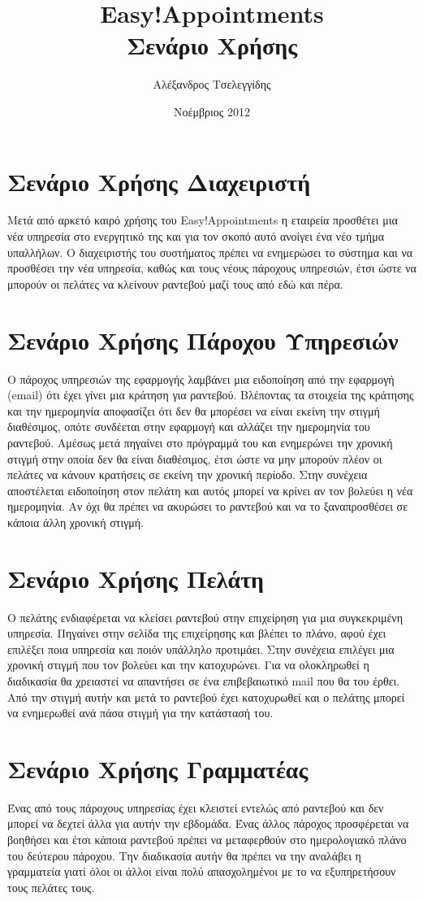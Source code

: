 \documentclass[12pt]{article}
\title{{\Huge {\bf Easy!Appointments}} \\[0.3cm] Σενάριο Χρήσης}
\author{Αλέξανδρος Τσελεγγίδης}
\date{Νοέμβριος 2012}
\begin{document}
\maketitle 
\thispagestyle{empty} %
\pagebreak

\section{Σενάριο Χρήσης Διαχειριστή}
Μετά από αρκετό καιρό χρήσης του Easy!Appointments η εταιρεία προσθέτει μια νέα υπηρεσία στο ενεργητικό της και για τον σκοπό αυτό ανοίγει ένα νέο τμήμα υπαλλήλων. Ο διαχειριστής του συστήματος πρέπει να ενημερώσει το σύστημα και να προσθέσει την νέα υπηρεσία, καθώς και τους νέους πάροχους υπηρεσιών, έτσι ώστε να μπορούν οι πελάτες να κλείνουν ραντεβού μαζί τους από εδώ και πέρα.

\section{Σενάριο Χρήσης Πάροχου Υπηρεσιών}
Ο πάροχος υπηρεσιών της εφαρμογής λαμβάνει μια ειδοποίηση από την εφαρμογή (email) ότι έχει γίνει μια κράτηση για ραντεβού. Βλέποντας τα στοιχεία της κράτησης και την ημερομηνία αποφασίζει ότι δεν θα μπορέσει να είναι εκείνη την στιγμή διαθέσιμος, οπότε συνδέεται στην εφαρμογή και αλλάζει την ημερομηνία του ραντεβού. Αμέσως μετά πηγαίνει στο πρόγραμμά του και ενημερώνει την χρονική στιγμή στην οποία δεν θα είναι διαθέσιμος, έτσι ώστε να μην μπορούν πλέον οι πελάτες να κάνουν κρατήσεις σε εκείνη την χρονική περίοδο. Στην συνέχεια αποστέλεται ειδοποίηση στον πελάτη και αυτός μπορεί να κρίνει αν τον βολεύει η νέα ημερομηνία. Αν όχι θα πρέπει να ακυρώσει το ραντεβού και να το ξαναπροσθέσει σε κάποια άλλη χρονική στιγμή. 

\section{Σενάριο Χρήσης Πελάτη}
Ο πελάτης ενδιαφέρεται να κλείσει ραντεβού στην επιχείρηση για μια συγκεκριμένη υπηρεσία. Πηγαίνει στην σελίδα της επιχείρησης και βλέπει το πλάνο, αφού έχει επιλέξει ποια υπηρεσία και ποιόν υπάλληλο προτιμάει. Στην συνέχεια επιλέγει μια χρονική στιγμή που τον βολεύει και την κατοχυρώνει. Για να ολοκληρωθεί η διαδικασία θα χρειαστεί να απαντήσει σε ένα επιβεβαιωτικό mail που θα του έρθει. Από την στιγμή αυτήν και μετά το ραντεβού έχει κατοχυρωθεί και ο πελάτης μπορεί να ενημερωθεί ανά πάσα στιγμή για την κατάστασή του.

\section{Σενάριο Χρήσης Γραμματέας}
Ένας από τους πάροχους υπηρεσίας έχει κλειστεί εντελώς από ραντεβού και δεν μπορεί να δεχτεί άλλα για αυτήν την εβδομάδα. Ένας άλλος πάροχος προσφέρεται να βοηθήσει και έτσι κάποια ραντεβού πρέπει να μεταφερθούν στο ημερολογιακό πλάνο του δεύτερου πάροχου. Την διαδικασία αυτήν θα πρέπει να την αναλάβει η γραμματεία γιατί όλοι οι άλλοι είναι πολύ απασχολημένοι με το να εξυπηρετήσουν τους πελάτες τους.
\end{document}
